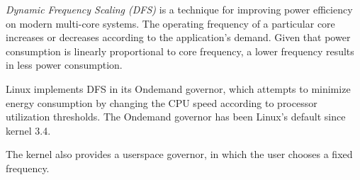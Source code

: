 \emph{Dynamic Frequency Scaling (DFS)} is a technique for improving power efficiency on modern multi-core systems. The operating frequency of a particular core increases or decreases according to the application's demand. Given that power consumption is linearly proportional to core frequency, a lower frequency results in less power consumption.

Linux implements DFS in its Ondemand governor, which attempts to minimize energy consumption by changing the CPU speed according to processor utilization thresholds. The Ondemand governor has been Linux's default since kernel 3.4.

The kernel also provides a userspace governor, in which the user chooses a fixed frequency. 

